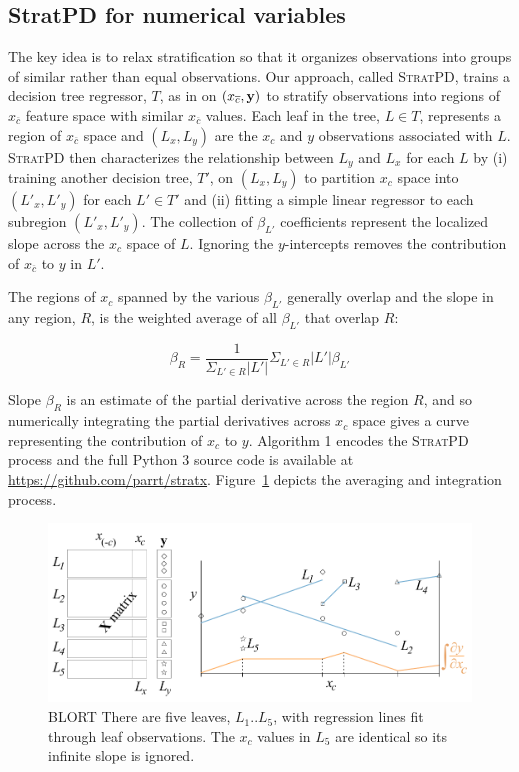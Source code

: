 \documentclass[12pt]{article}
\newcommand{\figref}[1]{Figure~\ref{#1}}
\newcommand{\spd}{\fontfamily{cmr}\textsc{\small StratPD}}
\newcommand{\xnc}{$x_{\overline{c}}$}
\begin{document}
\subsection{StratPD for numerical variables}

The key idea is to relax stratification so that it organizes observations into groups of similar rather than equal observations.  Our approach, called \spd, trains a decision tree regressor, $T$, as in \cite{CART} on $(x_{\overline{c}}, {\bf y})$ to stratify observations into regions of \xnc{} feature space with similar \xnc{} values. Each leaf in the tree, $L \in T$, represents a region of \xnc{} space and $(L_x, L_y)$ are the $x_c$ and $y$ observations associated with $L$. \spd{} then characterizes the relationship between $L_y$ and $L_x$ for each $L$ by (i) training another decision tree, $T'$, on $(L_x, L_y)$ to partition $x_c$ space into $(L'_x, L'_y)$ for each $L' \in T'$ and (ii) fitting a simple linear regressor to each subregion $(L'_x, L'_y)$.  The collection of $\beta_{L'}$ coefficients represent the localized slope across the $x_c$ space of $L$. Ignoring the $y$-intercepts removes the contribution of \xnc{} to $y$ in $L'$.

The regions of $x_c$ spanned by the various $\beta_{L'}$ generally overlap and the slope in any  region, $R$, is the weighted average of all $\beta_{L'}$ that overlap $R$:

\[
\beta_R = \frac{1}{\Sigma_{L' \in R} |L'|}\Sigma_{L' \in R}|L'|\beta_{L'}
\]

Slope $\beta_R$ is an estimate of the partial derivative across the region $R$, and so numerically integrating the partial derivatives across $x_c$ space gives a curve representing the contribution of $x_c$ to $y$.  Algorithm 1 encodes the \spd{} process and the full Python 3 source code is available at {\small \url{https://github.com/parrt/stratx}}. \figref{fig:leaves} depicts the averaging and integration process.  

\begin{figure}[htbp]
\begin{center}
\includegraphics[scale=0.7]{images/leaves.pdf}
\caption{BLORT There are five leaves, $L_1 .. L_5$, with regression lines fit through leaf observations. The $x_c$ values in $L_5$ are identical so its infinite slope is ignored.}
\label{fig:leaves}
\end{center}
\end{figure}
\end{document}
